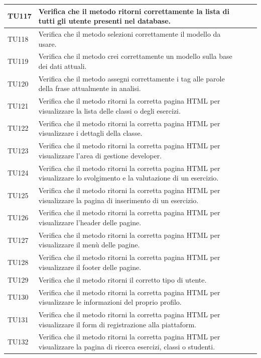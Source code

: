 \begin{longtable}{|>{\centering\arraybackslash}m{1.6cm}|>{\centering\arraybackslash}m{6.41cm}|>{\centering\arraybackslash}m{3.1cm}| c |}
		\rowcolor{LightGray}
		TU117 & Verifica che il metodo ritorni correttamente la lista di tutti gli utente presenti nel database.  \\ \hline
		TU118 & Verifica che il metodo selezioni correttamente il modello da usare.  \\ \hline
		\rowcolor{LightGray}
		TU119 & Verifica che il metodo crei correttamente un modello sulla base dei dati attuali.  \\ \hline
		TU120 & Verifica che il metodo assegni correttamente i tag alle parole della frase attualmente in analisi.  \\ \hline
		\rowcolor{LightGray}
		TU121 & Verifica che il metodo ritorni la corretta pagina HTML per visualizzare la lista delle classi o degli esercizi. \\ \hline
		TU122 & Verifica che il metodo ritorni la corretta pagina HTML per visualizzare i dettagli della classe. \\ \hline
		\rowcolor{LightGray}
		TU123 & Verifica che il metodo ritorni la corretta pagina HTML per visualizzare l'area di gestione developer. \\ \hline
		TU124 & Verifica che il metodo ritorni la corretta pagina HTML per visualizzare lo svolgimento e la valutazione di un esercizio. \\ \hline
		\rowcolor{LightGray}
		TU125 & Verifica che il metodo ritorni la corretta pagina HTML per visualizzare la pagina di inserimento di un esercizio. \\ \hline
		TU126 & Verifica che il metodo ritorni la corretta pagina HTML per visualizzare l'header delle pagine. \\ \hline
		\rowcolor{LightGray}
		TU127 & Verifica che il metodo ritorni la corretta pagina HTML per visualizzare il menù delle pagine. \\ \hline
		TU128 & Verifica che il metodo ritorni la corretta pagina HTML per visualizzare il footer delle pagine. \\ \hline
		\rowcolor{LightGray}
		TU129 & Verifica che il metodo ritorni il corretto tipo di utente. \\ \hline
		TU130 & Verifica che il metodo ritorni la corretta pagina HTML per visualizzare le informazioni del proprio profilo. \\ \hline
		\rowcolor{LightGray}
		TU131 & Verifica che il metodo ritorni la corretta pagina HTML per visualizzare il form di registrazione alla piattaform. \\ \hline
		TU132 & Verifica che il metodo ritorni la corretta pagina HTML per visualizzare la pagina di ricerca esercizi, classi o studenti. \\ \hline

\end{longtable}
